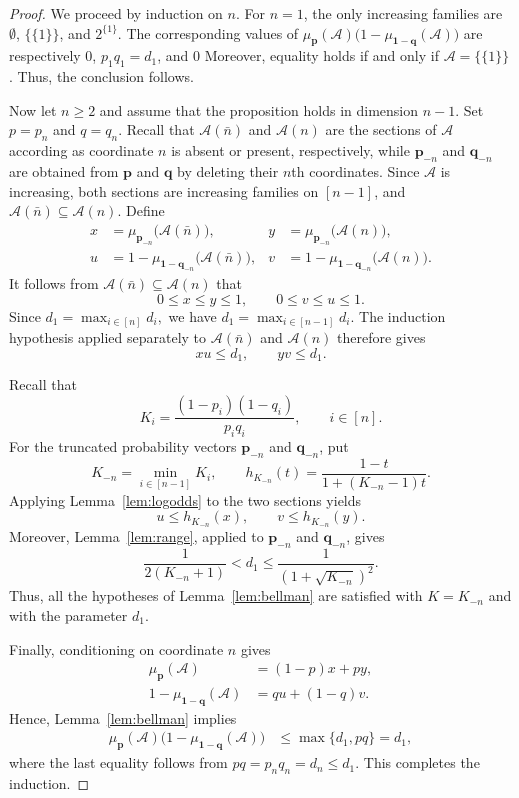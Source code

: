 \documentclass[11pt]{article}
\numberwithin{equation}{section}
\theoremstyle{definition}
\theoremstyle{remark}
\begin{document}
\begin{proof}
We proceed by induction on $n$. For $n=1$, the only increasing families are
$\emptyset$, $\{\{1\}\}$, and $2^{\{1\}}$.  The corresponding values of
$
\mu_{\mathbf p}(\mathcal A)
\bigl(1-\mu_{\mathbf 1-\mathbf q}(\mathcal A)\bigr)
$
are respectively $0$, $p_1q_1=d_1$, and $0$
Moreover, equality holds if and only if $\mathcal A=\{\{1\}\}$.
Thus, the conclusion follows.

Now let $n\geq2$ and assume that the proposition holds in dimension
$n-1$.  Set
$
 p=p_n$
and
$
q=q_n.
$
Recall that $\mathcal{A}(\bar n)$ and $\mathcal{A}(n)$ are the sections
of $\mathcal{A}$ according as coordinate $n$ is absent or present,
respectively, while $\mathbf p_{-n}$ and $\mathbf q_{-n}$ are obtained
from $\mathbf p$ and $\mathbf q$ by deleting their $n$th coordinates.
Since $\mathcal{A}$ is increasing, both sections are increasing families
on $[n-1]$, and
$
 \mathcal{A}(\bar n)\subseteq\mathcal{A}(n).
$
Define
\begin{align*}
 x&=\mu_{\mathbf p_{-n}}\bigl(\mathcal{A}(\bar n)\bigr),
&
 y&=\mu_{\mathbf p_{-n}}\bigl(\mathcal{A}(n)\bigr),\\
 u&=1-\mu_{\mathbf 1-\mathbf q_{-n}}
       \bigl(\mathcal{A}(\bar n)\bigr),
&
 v&=1-\mu_{\mathbf 1-\mathbf q_{-n}}
       \bigl(\mathcal{A}(n)\bigr).
\end{align*}
It follows from $\mathcal{A}(\bar n)\subseteq\mathcal{A}(n)$ that
\[
 0\leq x\leq y\leq1,
 \qquad
 0\leq v\leq u\leq1.
\]
Since
$
 d_1=\max_{i\in[n]}d_i,
$
 we
have
$
 d_1=\max_{i\in[n-1]}d_i.
$
The induction hypothesis applied separately to
$\mathcal{A}(\bar n)$ and $\mathcal{A}(n)$ therefore gives
\[
 xu\leq d_1,
 \qquad
 yv\leq d_1.
\]

Recall that
\[
 K_i=\frac{(1-p_i)(1-q_i)}{p_iq_i},
 \qquad i\in[n].
\]
For the truncated probability vectors $\mathbf p_{-n}$ and
$\mathbf q_{-n}$, put
\[
 K_{-n}=\min_{i\in[n-1]}K_i,
 \qquad
 h_{K_{-n}}(t)
 =
 \frac{1-t}{1+(K_{-n}-1)t}.
\]
Applying Lemma~\ref{lem:logodds} to the two sections yields
\[
 u\leq h_{K_{-n}}(x),
 \qquad
 v\leq h_{K_{-n}}(y).
\]
Moreover, Lemma~\ref{lem:range}, applied to
$\mathbf p_{-n}$ and $\mathbf q_{-n}$, gives
\[
 \frac{1}{2(K_{-n}+1)}
 <
 d_1
 \leq
 \frac{1}{(1+\sqrt{K_{-n}})^2}.
\]
Thus, all the hypotheses of Lemma~\ref{lem:bellman} are satisfied with
$K=K_{-n}$ and with the parameter $d_1$.

Finally, conditioning on coordinate $n$ gives
\begin{align*}
 \mu_{\mathbf p}(\mathcal{A})
 &=(1-p)x+py,\\
 1-\mu_{\mathbf 1-\mathbf q}(\mathcal{A})
 &=qu+(1-q)v.
\end{align*}
Hence, Lemma~\ref{lem:bellman} implies
\begin{align*}
 \mu_{\mathbf p}(\mathcal{A})
 \bigl(1-\mu_{\mathbf 1-\mathbf q}(\mathcal{A})\bigr)
 &\leq \max\{d_1,pq\}=d_1,
\end{align*}
where the last equality follows from
$pq=p_nq_n=d_n\leq d_1$.  This completes the induction.
\end{proof}
\end{document}
